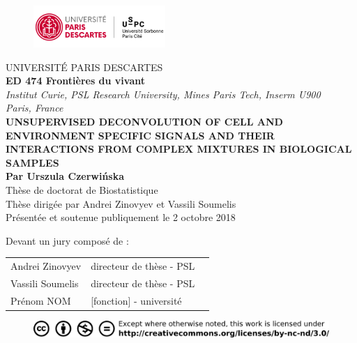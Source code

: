 \documentclass[12pt,]{book}
\title{}
\author{}
\date{}
\theoremstyle{definition}
\theoremstyle{definition}
\theoremstyle{definition}
\theoremstyle{remark}
\begin{document}
\begin{titlepage}
\frontmatter
\begin{figure}[t]
\includegraphics[width=5cm]{figures-ext/LogoParisDescartes}
\end{figure}
\begin{center}
UNIVERSITÉ PARIS DESCARTES \\
\vspace*{1cm}
\textbf{ED 474 Frontières du vivant}\\
\vspace*{0,5cm}
\textit{Institut Curie, PSL Research University, Mines Paris Tech, Inserm U900 \\Paris, France}\\
\vspace*{1cm}
\LARGE{\textbf{UNSUPERVISED DECONVOLUTION OF CELL AND ENVIRONMENT SPECIFIC SIGNALS AND
THEIR INTERACTIONS FROM COMPLEX MIXTURES IN BIOLOGICAL SAMPLES}}\\
\large{\textbf{Par Urszula Czerwińska}}\\
\vspace*{1cm}
Thèse de doctorat de Biostatistique\\
\vspace*{1cm}
Thèse dirigée par Andrei Zinovyev et Vassili Soumelis\\
\vspace*{1cm}
\small{Présentée et soutenue publiquement le 2 octobre 2018}\\
\end{center}
\vspace*{1cm}
\begin{footnotesize}
Devant un jury composé de : \\
\begin{tabular}{lll}
Andrei Zinovyev & directeur de thèse - PSL\\
Vassili Soumelis & directeur de thèse - PSL\\
Prénom NOM & [fonction] - université\\

\end{tabular}
\end{footnotesize}

\begin{figure}[b]
\begin{center}
\includegraphics{figures-ext/creativecommons}
\end{center}
\end{figure}





\end{titlepage}
\end{document}
